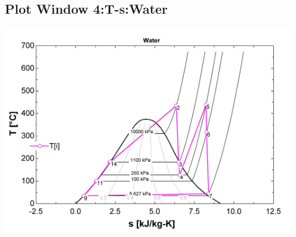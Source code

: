 \documentclass[10pt,fleqn]{article}
\theoremstyle{mytheoremstyle}
\theoremstyle{mytheoremstyle}
\theoremstyle{myproblemstyle}
\begin{document}
\begin{enumerate}
    \subsection*{Plot Window 4:\;T-s:\;Water}
    {\centerline{\includegraphics[width=5.0in,keepaspectratio]{Taller2_P1.jpg}}}
\end{enumerate}
\end{document}

